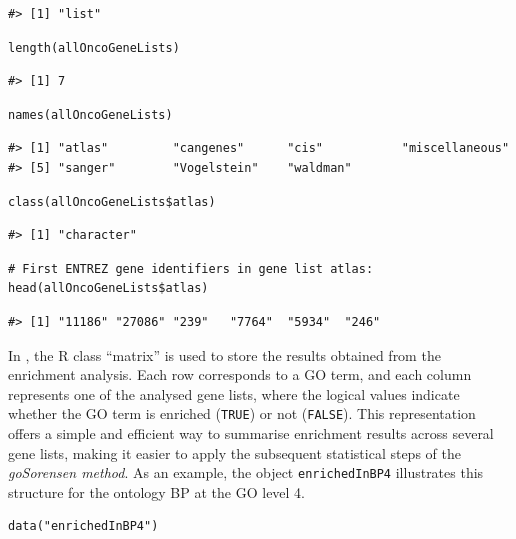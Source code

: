 \begin{verbatim}
#> [1] "list"
\end{verbatim}

\begin{verbatim}
length(allOncoGeneLists)
\end{verbatim}

\begin{verbatim}
#> [1] 7
\end{verbatim}

\begin{verbatim}
names(allOncoGeneLists)
\end{verbatim}

\begin{verbatim}
#> [1] "atlas"         "cangenes"      "cis"           "miscellaneous"
#> [5] "sanger"        "Vogelstein"    "waldman"
\end{verbatim}

\begin{verbatim}
class(allOncoGeneLists$atlas)
\end{verbatim}

\begin{verbatim}
#> [1] "character"
\end{verbatim}

\begin{verbatim}
# First ENTREZ gene identifiers in gene list atlas:
head(allOncoGeneLists$atlas)
\end{verbatim}

\begin{verbatim}
#> [1] "11186" "27086" "239"   "7764"  "5934"  "246"
\end{verbatim}

In , the R class ``matrix'' is used to store the results obtained from the enrichment analysis. Each row corresponds to a GO term, and each column represents one of the analysed gene lists, where the logical values indicate whether the GO term is enriched (\texttt{TRUE}) or not (\texttt{FALSE}). This representation offers a simple and efficient way to summarise enrichment results across several gene lists, making it easier to apply the subsequent statistical steps of the \emph{goSorensen method}. As an example, the object \texttt{enrichedInBP4} illustrates this structure for the ontology BP at the GO level 4.

\begin{verbatim}
data("enrichedInBP4")
\end{verbatim}

